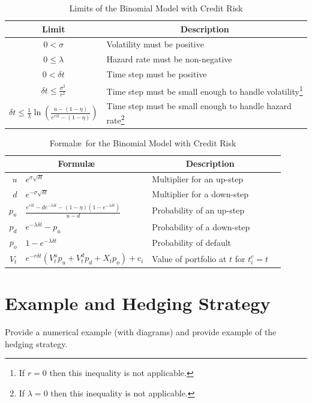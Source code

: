 \documentclass[a4paper,11pt,oneside]{report}
\theoremstyle{plain}
\theoremstyle{definition}
\def\h{\\\hline}
\newcommand{\theader}[1]{\multicolumn{1}{|c|}{\textbf{#1}}}
\def\Dt{\ensuremath{\delta t}\xspace}
\def\u{\ensuremath{u}\xspace}
\def\d{\ensuremath{d}\xspace}
\def\o{\ensuremath{o}\xspace}
\def\pu{\ensuremath{p_\u}\xspace}
\def\pd{\ensuremath{p_\d}\xspace}
\def\po{\ensuremath{p_\o}\xspace}
\def\V{\ensuremath{V_t}\xspace}
\def\Vu{\ensuremath{V^{u}_t}\xspace}
\def\Vd{\ensuremath{V^{d}_t}\xspace}
\def\X{\ensuremath{X_t}\xspace}
\begin{document}
\begin{savenotes}
\begin{table}[ht]
 \centering
 \begin{tabular}{|c|l|}\hline
  \theader{Limit}                & \theader{Description} \h
  $0 < \sigma$                   & Volatility must be positive \h
  $0 \le \lambda$                & Hazard rate must be non-negative \h
  $0 < \Dt$                      & Time step must be positive \h
  $\Dt \le \frac{\sigma^2}{r^2}$ & Time step must be small enough to handle volatility\footnote{If $r = 0$ then this inequality is not applicable.} \h
  $\Dt \le \frac{1}{\lambda}\ln\left(\frac{u - (1 - \eta)}{e^{r\Dt} - (1 - \eta)}\right)$ & Time step must be small enough to handle hazard rate\footnote{If $\lambda = 0$ then this inequality is not applicable.} \h
 \end{tabular}
 \caption{Limits of the Binomial Model with Credit Risk}
 \label{tab:bin_limit}
\end{table}
\end{savenotes}

\begin{table}[ht]
 \centering
 \begin{tabular}{|r@{ = }l|l|l|}\hline
  \multicolumn{2}{|c|}{\textbf{Formul\ae}} & \theader{Description} \h
  \u     & $e^{\sigma\sqrt{\Dt}}$ &
     Multiplier for an up-step \h
  \d     & $e^{-\sigma\sqrt{\Dt}}$ &
     Multiplier for a down-step \h
  \pu    & $\frac{e^{r\Dt} - \d e^{-\lambda\Dt} - (1 - \eta)(1 - e^{-\lambda\Dt})}{\u - \d}$ &
     Probability of an up-step \h
  \pd    & $e^{-\lambda\Dt} - \pu$ &
     Probability of a down-step \h
  \po    & $1 - e^{-\lambda\Dt}$ &
     Probability of default \h
  \V     & $e^{-r\Dt}(\Vu\pu + \Vd\pd + \X\po) + c_i$ &
     Value of portfolio at $t$ for $t^{c}_i = t$ \h
 \end{tabular}
 \caption{Formal\ae\ for the Binomial Model with Credit Risk}
 \label{tab:bin_formulae}
\end{table}


\section{Example and Hedging Strategy}
Provide a numerical example (with diagrams) and provide example of the hedging strategy.

\end{document}
